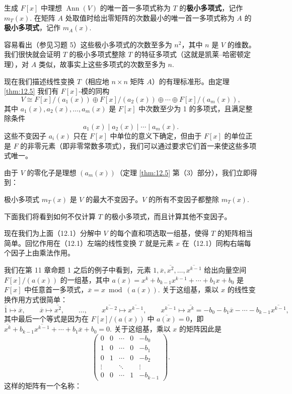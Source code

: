 \begin{definition}
生成 \(F[x]\) 中理想 \(\operatorname{Ann}(V)\) 的唯一首一多项式称为 \(T\) 的\textbf{极小多项式}，记作 \(m_T(x)\). 在矩阵 \(A\) 处取值时给出零矩阵的次数最小的唯一首一多项式称为 \(A\) 的\textbf{极小多项式}，记作 \(m_A(x)\).
\end{definition}

容易看出（参见习题 5）这些极小多项式的次数至多为 \(n^2\)，其中 \(n\) 是 \(V\) 的维数。我们很快就会证明 \(T\) 的极小多项式整除 \(T\) 的特征多项式（这就是凯莱--哈密顿定理），对 \(A\) 类似，故事实上这些多项式的次数至多为 \(n\).

现在我们描述线性变换 \(T\)（相应地 \(n \times n\) 矩阵 \(A\)）的有理标准形。由定理 \ref{thm:12.5} 我们有 \(F[x]\)-模的同构
\begin{equation}
V \cong F[x]/(a_1(x)) \oplus F[x]/(a_2(x)) \oplus \cdots \oplus F[x]/(a_m(x)), \tag{12.1}
\end{equation}
其中 \(a_1(x), a_2(x), \ldots, a_m(x)\) 是 \(F[x]\) 中次数至少为 1 的多项式，且满足整除条件
\[
a_1(x) \mid a_2(x) \mid \cdots \mid a_m(x).
\]
这些不变因子 \(a_i(x)\) 只在 \(F[x]\) 中单位的意义下确定，但由于 \(F[x]\) 的单位正是 \(F\) 的非零元素（即非零常数多项式），我们可以通过要求它们首一来使这些多项式唯一。

由于 \(V\) 的零化子是理想 \((a_m(x))\)（定理 \ref{thm:12.5} 第（3）部分），我们立即得到：

\begin{proposition}\label{pro:12.13}
极小多项式 \(m_T(x)\) 是 \(V\) 的最大不变因子。\(V\) 的所有不变因子都整除 \(m_T(x)\).
\end{proposition}

下面我们将看到如何不仅计算 \(T\) 的极小多项式，而且计算其他不变因子。

现在我们为上面（12.1）分解中 \(V\) 的每个直和项选取一组基，使得 \(T\) 的矩阵相当简单。回忆作用在（12.1）左端的线性变换 \(T\) 就是元素 \(x\) 在（12.1）同构右端每个因子上由乘法作用。

我们在第 11 章命题 1 之后的例子中看到，元素 \(1, \overline{x}, \overline{x^2}, \ldots, \overline{x^{k-1}}\) 给出向量空间 \(F[x]/(a(x))\) 的一组基，其中 \(a(x) = x^k+b_{k-1}x^{k-1}+\cdots+b_1x+b_0\) 是 \(F[x]\) 中任意首一多项式，\(\overline{x} = x \bmod (a(x))\). 关于这组基，乘以 \(x\) 的线性变换作用方式很简单：
\[
\overline{1} \mapsto \overline{x}, \qquad \overline{x} \mapsto \overline{x^2}, \qquad \ldots, \qquad \overline{x^{k-2}} \mapsto \overline{x^{k-1}}, \qquad \overline{x^{k-1}} \mapsto \overline{x^k} = -b_0-b_1\overline{x}-\cdots-b_{k-1}\overline{x^{k-1}},
\]
其中最后一个等式是因为在 \(F[x]/(a(x))\) 中 \(\overline{a(x)} = 0\)，即 \(\overline{x^k}+b_{k-1}\overline{x^{k-1}}+\cdots+b_1\overline{x}+b_0 = 0\). 关于这组基，乘以 \(x\) 的矩阵因此是
\[
\begin{pmatrix}
0 & 0 & \cdots & 0 & -b_0\\
1 & 0 & \cdots & 0 & -b_1\\
0 & 1 & \cdots & 0 & -b_2\\
\vdots & & \ddots & & \vdots\\
0 & 0 & \cdots & 1 & -b_{k-1}
\end{pmatrix}.
\]
这样的矩阵有一个名称：

